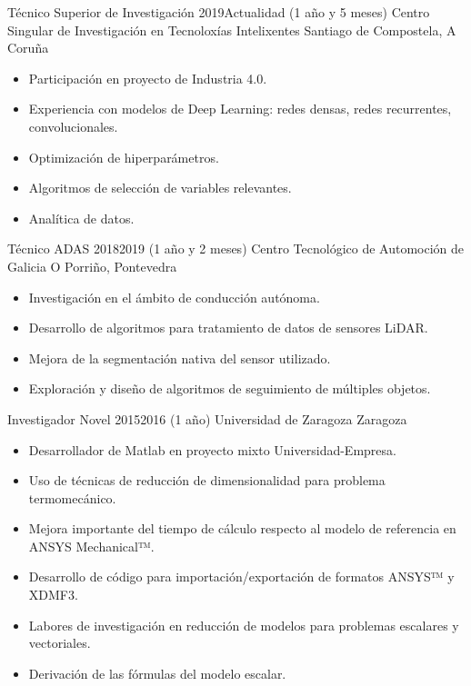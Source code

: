 \cvitem
    {Técnico Superior de Investigación}
    {2019}{Actualidad (1 año y 5 meses)}
    {Centro Singular de Investigación en Tecnoloxías Intelixentes}
    {Santiago de Compostela, A Coruña}
\begin{itemize}
  \small
\item Participación en proyecto de Industria 4.0.
\item Experiencia con modelos de Deep Learning: redes densas, redes recurrentes, convolucionales.
\item Optimización de hiperparámetros.
\item Algoritmos de selección de variables relevantes.
\item Analítica de datos.
\end{itemize}


\cvitem
    {Técnico ADAS} %
    {2018}{2019 (1 año y 2 meses)} %
    {Centro Tecnológico de Automoción de Galicia} %
    {O Porriño, Pontevedra} %
\begin{itemize}
    \small
    \item Investigación en el ámbito de conducción autónoma.
    \item Desarrollo de algoritmos para tratamiento de datos de sensores LiDAR.
    \item Mejora de la segmentación nativa del sensor utilizado.
    \item Exploración y diseño de algoritmos de seguimiento de múltiples objetos.
\end{itemize}

\cvitem
    {Investigador Novel} %
    {2015}{2016 (1 año)} %
    {Universidad de Zaragoza} %
    {Zaragoza} %
\begin{itemize}
    \small
    \item Desarrollador de Matlab en proyecto mixto Universidad-Empresa.
    \item Uso de técnicas de reducción de dimensionalidad para problema termomecánico.
    \item Mejora importante del tiempo de cálculo respecto al modelo de referencia en ANSYS Mechanical™.
    \item Desarrollo de código para importación/exportación de formatos ANSYS™ y XDMF3.
    \item Labores de investigación en reducción de modelos para problemas escalares y vectoriales.
    \item Derivación de las fórmulas del modelo escalar.
\end{itemize}

